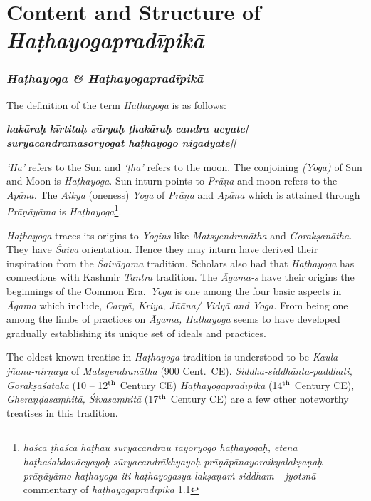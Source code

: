 \part{Content and Structure of \textit{Haṭhayogapradīpikā}}


\section*{\textit{Haṭhayoga \&  Haṭhayogapradīpikā}}

The definition of the term \textit{Haṭhayoga} is as follows:

\begin{shloka}
\textit{\textbf{hakāraḥ kīrtitaḥ sūryaḥ ṭhakāraḥ candra ucyate|}}\\
\textit{\textbf{sūryācandramasoryogāt haṭhayogo nigadyate||}}

\end{shloka}

\textit{`Ha'} refers to the Sun and \textit{`ṭha'} refers to the moon. The conjoining \textit{(Yoga)} of Sun and Moon is \textit{Haṭhayoga}. Sun inturn points to \textit{Prāṇa} and moon refers to the \textit{Apāna.} The \textit{Aikya} (oneness) \textit{Yoga} of \textit{Prāṇa} and \textit{Apāna} which is attained through \textit{Prāṇāyāma} is \textit{Haṭhayoga}\footnote[4]{\textit{haśca ṭhaśca haṭhau sūryacandrau tayoryogo haṭhayogaḥ, etena haṭhaśabdavācyayoḥ sūryacandrākhyayoḥ prāṇāpānayoraikyalakṣaṇaḥ prāṇāyāmo haṭhayoga iti haṭhayogasya lakṣaṇaṁ siddham  - jyotsnā} commentary of \textit{haṭhayogapradīpika} 1.1}.

\textit{Haṭhayoga} traces its origins to \textit{Yogins} like \textit{Matsyendranātha} and \textit{Gorakṣanātha.} They have \textit{Śaiva} orientation. Hence they may inturn have derived their inspiration from the \textit{Śaivāgama} tradition. Scholars also had that \textit{Haṭhayoga} has connections with Kashmir \textit{Tantra} tradition.  The \textit{Āgama-s} have their origins the beginnings of the Common Era.\ \textit{Yoga} is one among the four basic aspects in \textit{Āgama} which include, \textit{Caryā, Kriya, Jñāna/ Vidyā and Yoga.} From being one among the limbs of practices on \textit{Āgama, Haṭhayoga} seems to have developed gradually establishing its unique set of ideals and practices.

The oldest known treatise in \textit{Haṭhayoga} tradition is understood to be \textit{Kaula-jñana-nirṇaya} of \textit{Matsyendranātha} (900 Cent.\ CE). \textit{Siddha-\break siddhānta-paddhati, Gorakṣaśataka} (10 -- 12$^{\rm th}$ Century CE) \textit{Haṭha\-yoga\-pra\-dī\-pika} (14$^{\rm th}$ Century CE), \textit{Gheraṇḍasaṃhitā, Śivasaṃhitā} (17$^{\rm th}$ Century CE) are a few other noteworthy treatises in this tradition.

